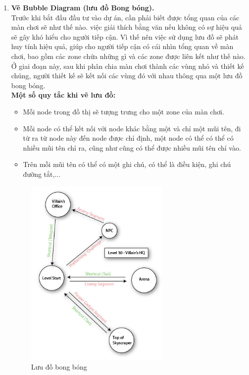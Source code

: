 \begin{enumerate}
	
	\item \textbf{Vẽ Bubble Diagram (lưu đồ Bong bóng).}\\
	\hspace*{0.5cm}  Trước khi bắt đầu đầu tư vào dự án, cần phải biết được tổng quan của các màn chơi sẽ như thế nào. việc giải thích bằng văn nếu không có sự hiệu quả sẽ gây khó hiểu cho người tiếp cận. Vì thế nên việc sử dụng lưu đồ sẽ phát huy tính hiệu quả, giúp cho người tiếp cận có cái nhìn tổng quan về màn chơi, bao gồm các zone chứa những gì và các zone được liên kết như thế nào. Ở giai đoạn này, sau khi phân chia màn chơi thành các vùng nhỏ và thiết kế chúng, người thiết kế sẽ kết nối các vùng đó với nhau thông qua một lưu đồ bong bóng.\\
	\textbf{Một số quy tắc khi vẽ lưu đồ:}
	\begin{itemize}
		\item Mỗi node trong đồ thị sẽ tượng trưng cho một zone của màn chơi.
		\item Mỗi node có thể kết nối với node khác bằng một và chỉ một mũi tên, đi từ ra từ node này đến node được chỉ định, một node có thể có thể có nhiều mũi tên chỉ ra, cũng như cũng có thể được nhiều mũi tên chỉ vào.
		\item Trên  mỗi mũi tên có thể có một ghi chú, có thể là điều kiện, ghi chú đường tắt,...
	\end{itemize}
	\begin{figure}[H]
		\centering
		\includegraphics[width=7cm]{Images/bubblediagram.jpg}
		\vspace{0.5cm}
		\caption{Lưu đồ bong bóng}
	\end{figure}
	\hspace*{0.5cm} 

\end{enumerate}
